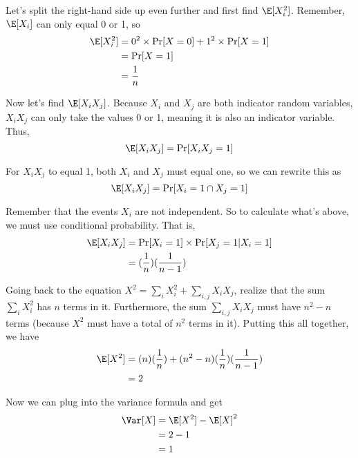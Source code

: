 Let’s split the right-hand side up even further and first find $\E[X_{i}^{2}]$. Remember, $\E[X_{i}]$ can only equal 0 or 1, so
    \begin{align*}
        \E[X_{i}^{2}] &= 0^{2} \times \Pr[X = 0] + 1^{2} \times \Pr[X = 1] \\
        &= \Pr[X = 1] \\
        &= \frac{1}{n}
    \end{align*}
    
Now let's find $\E[X_{i}X_{j}]$. Because $X_{i}$ and $X_{j}$ are both indicator random variables, $X_{i}X_{j}$ can only take the values 0 or 1, meaning it is also an indicator variable. Thus, 
    $$
    \E[X_{i}X_{j}] = \Pr[X_{i}X_{j} = 1]
    $$

For $X_{i}X_{j}$ to equal 1, both $X_{i}$ and $X_{j}$ must equal one, so we can rewrite this as
    $$
    \E[X_{i}X_{j}] = \Pr[X_{i} = 1 \cap X_{j} = 1]
    $$
    
Remember that the events $X_{i}$ are not independent. So to calculate what’s above, we must use conditional probability. That is,
    \begin{align*}
        \E[X_{i}X_{j}] &= \Pr[X_{i} = 1] \times \Pr[X_{j} = 1|X_{i} = 1] \\
        &= (\frac{1}{n})(\frac{1}{n-1})
    \end{align*}
    
\vspace{1.5mm}
    
Going back to the equation $X^{2} = \sum\limits_{i}X_{i}^{2} + \sum\limits_{i,j}X_{i}X_{j}$, realize that the sum $\sum\limits_{i}X_{i}^{2}$ has $n$ terms in it. Furthermore, the sum $\sum\limits_{i,j}X_{i}X_{j}$ must have $n^{2}-n$ terms (because $X^{2}$ must have a total of $n^{2}$ terms in it). Putting this all together, we have
    \begin{align*}
        \E[X^{2}] &= (n)(\frac{1}{n}) + (n^{2}-n)(\frac{1}{n})(\frac{1}{n-1}) \\
        &= 2
    \end{align*}
    
Now we can plug into the variance formula and get
\begin{align*}
    \Var[X] &= \E[X^{2}] - \E[X]^{2} \\
    &= 2 - 1 \\
    &= 1
\end{align*}
